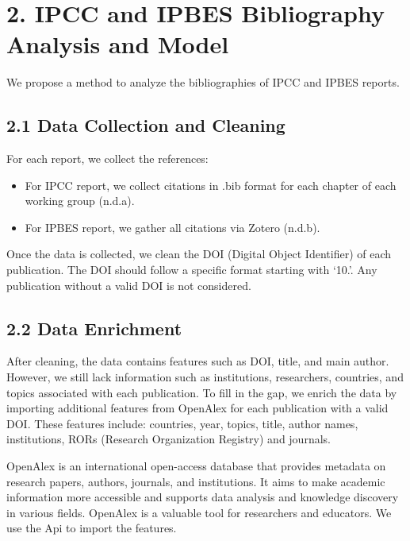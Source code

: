 \documentclass[
]{article}
\providecommand{\tightlist}{%
  \setlength{\itemsep}{0pt}\setlength{\parskip}{0pt}}
\begin{document}
\hypertarget{ipcc-and-ipbes-bibliography-analysis-and-model}{%
\section{2. IPCC and IPBES Bibliography Analysis and
Model}\label{ipcc-and-ipbes-bibliography-analysis-and-model}}

We propose a method to analyze the bibliographies of IPCC and IPBES
reports.

\hypertarget{data-collection-and-cleaning}{%
\subsection{2.1 Data Collection and
Cleaning}\label{data-collection-and-cleaning}}

For each report, we collect the references:

\begin{itemize}
\tightlist
\item
  For IPCC report, we collect citations in .bib format for each chapter
  of each working group (n.d.a).
\item
  For IPBES report, we gather all citations via Zotero (n.d.b).
\end{itemize}

Once the data is collected, we clean the DOI (Digital Object Identifier)
of each publication. The DOI should follow a specific format starting
with `10.'. Any publication without a valid DOI is not considered.

\hypertarget{data-enrichment}{%
\subsection{2.2 Data Enrichment}\label{data-enrichment}}

After cleaning, the data contains features such as DOI, title, and main
author. However, we still lack information such as institutions,
researchers, countries, and topics associated with each publication. To
fill in the gap, we enrich the data by importing additional features
from OpenAlex for each publication with a valid DOI. These features
include: countries, year, topics, title, author names, institutions,
RORs (Research Organization Registry) and journals.

OpenAlex is an international open-access database that provides metadata
on research papers, authors, journals, and institutions. It aims to make
academic information more accessible and supports data analysis and
knowledge discovery in various fields. OpenAlex is a valuable tool for
researchers and educators. We use the Api to import the features.
\end{document}
